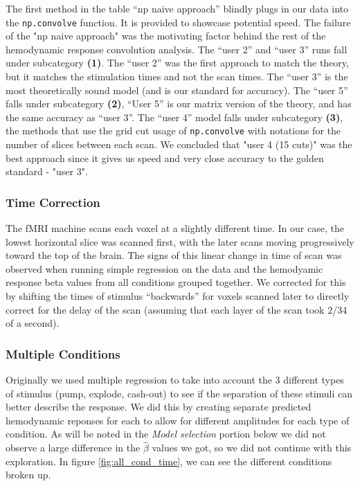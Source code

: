 \par \noindent The first method in the table ``np naive approach'' blindly 
plugs in our data into the \texttt{np.convolve} function. It is provided to 
showcase potential speed. The failure of the "np naive approach" was the 
motivating factor behind the rest of the hemodynamic response convolution 
analysis. The ``user 2'' and ``user 3'' runs fall under subcategory 
\textbf{(1)}. The ``user 2'' was the first approach to
match the theory, but it matches the stimulation times and not the scan times.
The ``user 3'' is the most theoretically sound model (and is our standard for 
accuracy). The ``user 5'' falls under subcategory \textbf{(2)}, ``User 5''  is
our matrix version of the theory, and has the same accuracy as ``user 3''. The 
``user 4'' model falls under subcategory \textbf{(3)}, the methods that use the
grid cut usage of \texttt{np.convolve} with notations for the number of slices 
between each scan. We concluded that "user 4 (15 cuts)" was the best approach 
since it gives us speed and very close accuracy to the golden standard - "user 
3".

\subsubsection{Time Correction}

\par \indent The fMRI machine scans each voxel at a slightly different time. 
In our case, the lowest horizontal slice was scanned first, with the later 
scans moving progressively toward the top of the brain. The signs of this 
linear change in time of scan was observed when running simple regression on 
the data and the hemodyamic response beta values from all conditions grouped 
together. We corrected for this  by shifting the times of stimulus 
``backwards'' for voxels scanned later to directly correct for the delay of 
the scan (assuming that each layer of the scan took 2/34 of a second).

\subsubsection{Multiple Conditions}

\par \indent Originally we used multiple regression to take into account the 3 
different types of stimulus (pump, explode, cash-out) to see if the separation 
of these stimuli can better describe the response. We did this by creating 
separate predicted hemodynamic reponses for each to allow for different 
amplitudes for each type of condition. As will be noted in the 
\textit{Model selection} portion below we did not observe a large difference in
the $\hat{\beta}$ values we got, so we did not continue with this exploration. 
In figure \ref{fig:all_cond_time}, we can see the different conditions broken 
up.


